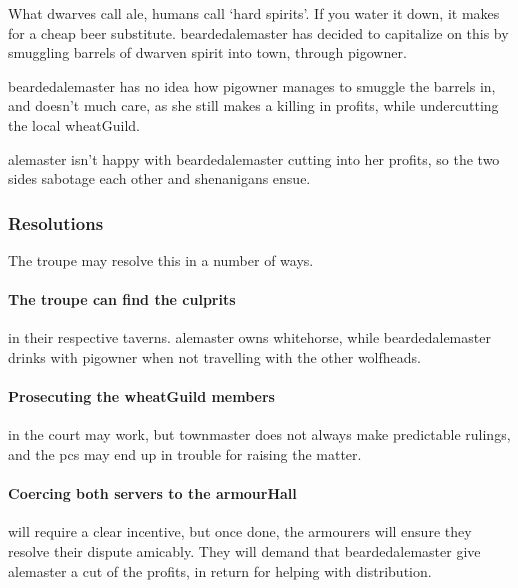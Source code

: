 
\label{troubleAle}

\noindent
What dwarves call ale, humans call `hard spirits'.
If you water it down, it makes for a cheap beer substitute.
\Gls{beardedalemaster} has decided to capitalize on this by smuggling barrels of dwarven spirit into \gls{town}, through \gls{pigowner}.

\Gls{beardedalemaster} has no idea how \gls{pigowner} manages to smuggle the barrels in, and doesn't much care, as she still makes a killing in profits, while undercutting the local \gls{wheatGuild}.

\Gls{alemaster} isn't happy with \gls{beardedalemaster} cutting into her profits, so the two sides sabotage each other and shenanigans ensue.

\subsubsection*{Resolutions}

The troupe may resolve this in a number of ways.

\paragraph{The troupe can find the culprits}
in their respective taverns.
\Gls{alemaster} owns \gls{whitehorse}, while \gls{beardedalemaster} drinks with \gls{pigowner} when not travelling with the other \glspl{wolfhead}.

\paragraph{Prosecuting the \gls{wheatGuild} members}
in the \gls{court} may work, but \gls{townmaster} does not always make predictable rulings, and the \glspl{pc} may end up in trouble for raising the matter.%

\paragraph{Coercing both \glspl{server} to the \gls{armourHall}}
will require a clear incentive, but once done, the \glspl{armourer} will ensure they resolve their dispute amicably.
They will demand that \gls{beardedalemaster} give \gls{alemaster} a cut of the profits, in return for helping with distribution.
\label{aleResolution}


